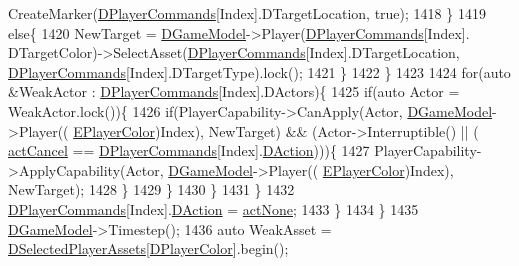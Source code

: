 \begin{DoxyCode}
      CreateMarker(\hyperlink{classCApplicationData_a2df1addeb7622233f72dc056bbcf31a1}{DPlayerCommands}[Index].DTargetLocation, \textcolor{keyword}{true});
1418                     \}
1419                     \textcolor{keywordflow}{else}\{
1420                         NewTarget = \hyperlink{classCApplicationData_a32b50c7c1cbac3cfd67c7f775b1d6fee}{DGameModel}->Player(\hyperlink{classCApplicationData_a2df1addeb7622233f72dc056bbcf31a1}{DPlayerCommands}[Index].
      DTargetColor)->SelectAsset(\hyperlink{classCApplicationData_a2df1addeb7622233f72dc056bbcf31a1}{DPlayerCommands}[Index].DTargetLocation, 
      \hyperlink{classCApplicationData_a2df1addeb7622233f72dc056bbcf31a1}{DPlayerCommands}[Index].DTargetType).lock();
1421                     \}
1422                 \}
1423                 
1424                 \textcolor{keywordflow}{for}(\textcolor{keyword}{auto} &WeakActor : \hyperlink{classCApplicationData_a2df1addeb7622233f72dc056bbcf31a1}{DPlayerCommands}[Index].DActors)\{
1425                     \textcolor{keywordflow}{if}(\textcolor{keyword}{auto} Actor = WeakActor.lock())\{
1426                         \textcolor{keywordflow}{if}(PlayerCapability->CanApply(Actor, \hyperlink{classCApplicationData_a32b50c7c1cbac3cfd67c7f775b1d6fee}{DGameModel}->Player((
      \hyperlink{GameDataTypes_8h_aafb0ca75933357ff28a6d7efbdd7602f}{EPlayerColor})Index), NewTarget) && (Actor->Interruptible() || (
      \hyperlink{GameDataTypes_8h_a35b98ce26aca678b03c6f9f76e4778ceaec5e11ffc62be241b4f6673586b35a6b}{actCancel} == \hyperlink{classCApplicationData_a2df1addeb7622233f72dc056bbcf31a1}{DPlayerCommands}[Index].\hyperlink{structSPlayerCommandRequest_a80897bbccf2c4e0b148a7aa815a926c6}{DAction})))\{
1427                             PlayerCapability->ApplyCapability(Actor, \hyperlink{classCApplicationData_a32b50c7c1cbac3cfd67c7f775b1d6fee}{DGameModel}->Player((
      \hyperlink{GameDataTypes_8h_aafb0ca75933357ff28a6d7efbdd7602f}{EPlayerColor})Index), NewTarget);
1428                         \}
1429                     \}
1430                 \}
1431             \}
1432             \hyperlink{classCApplicationData_a2df1addeb7622233f72dc056bbcf31a1}{DPlayerCommands}[Index].\hyperlink{structSPlayerCommandRequest_a80897bbccf2c4e0b148a7aa815a926c6}{DAction} = \hyperlink{GameDataTypes_8h_a35b98ce26aca678b03c6f9f76e4778ceaa8df154ad276f6f62054e9b5b0696f92}{actNone};
1433         \}
1434     \}
1435     \hyperlink{classCApplicationData_a32b50c7c1cbac3cfd67c7f775b1d6fee}{DGameModel}->Timestep();
1436     \textcolor{keyword}{auto} WeakAsset = \hyperlink{classCApplicationData_a05c1087d5a5c4ddc14fcb37444f1642b}{DSelectedPlayerAssets}[\hyperlink{classCApplicationData_a53550939b20cba70570f113e4d1c5d02}{DPlayerColor}].begin();

\end{DoxyCode}

